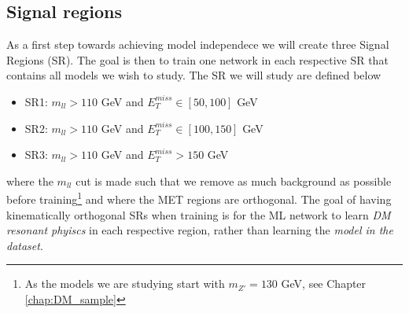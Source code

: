\documentclass[12pt, a4paper]{book}
\begin{document}
\subsection{Signal regions}\label{sec:SRs}
As a first step towards achieving model independece we will create three Signal Regions (SR). The goal is then to train one network in each respective SR that contains all models we wish to study. The SR we will study are defined below 
\begin{itemize}
   \item SR1: $m_{ll} >110$ GeV and $E_T^{miss} \in [50, 100]$ GeV
   \item SR2: $m_{ll} >110$ GeV and $E_T^{miss} \in [100, 150]$ GeV
   \item SR3: $m_{ll} >110$ GeV and $E_T^{miss} >150$ GeV
\end{itemize}
where the $m_{ll}$ cut is made such that we remove as much background as possible before training\footnote{As the models we are studying start with $m_{Z'}=130$ GeV, see Chapter \ref{chap:DM_sample}} and where the MET regions are orthogonal. 
The goal of having kinematically orthogonal SRs when training is for the ML network to learn \textit{DM resonant phyiscs} in each respective region, rather than learning the \textit{model in the dataset}.
\end{document}
